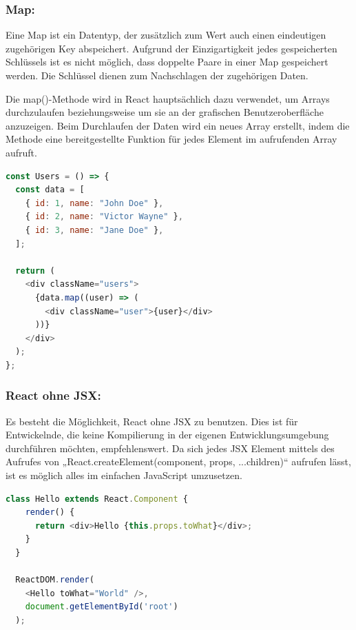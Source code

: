 \newpage

\subsubsection{Map:}
Eine Map ist ein Datentyp, der zusätzlich zum Wert auch einen eindeutigen zugehörigen Key abspeichert. Aufgrund der Einzigartigkeit jedes gespeicherten Schlüssels ist es nicht möglich, dass doppelte Paare in einer Map gespeichert werden. Die Schlüssel dienen zum Nachschlagen der zugehörigen Daten.

Die map()-Methode wird in React hauptsächlich dazu verwendet, um Arrays durchzulaufen beziehungsweise um sie an der grafischen Benutzeroberfläche anzuzeigen. Beim Durchlaufen der Daten wird ein neues Array erstellt, indem die Methode eine bereitgestellte Funktion für jedes Element im aufrufenden Array aufruft.
\cite{Map} \\

\begin{lstlisting}[language=JavaScript, caption=Beispiel Code für die Nutzung der map()-Methode, label=lst:impl:mapMethode]
  const Users = () => {
  const data = [
    { id: 1, name: "John Doe" },
    { id: 2, name: "Victor Wayne" },
    { id: 3, name: "Jane Doe" },
  ];

  return (
    <div className="users">
      {data.map((user) => (
        <div className="user">{user}</div>
      ))}
    </div>
  );
};
\end{lstlisting} \cite{Map}

\subsubsection{React ohne JSX:}
Es besteht die Möglichkeit, React ohne JSX zu benutzen. Dies ist für Entwickelnde, die keine Kompilierung in der eigenen Entwicklungsumgebung durchführen möchten, empfehlenswert.
Da sich jedes JSX Element mittels des Aufrufes von „React.createElement(component, props, ...children)“ aufrufen lässt, ist es möglich alles im einfachen JavaScript umzusetzen.
\cite{JSX} \\
\begin{lstlisting}[language=JavaScript, caption=Beispiel Code 'Hello World' mit JSX, label=lst:impl:helloWorldJSX]
  class Hello extends React.Component {
    render() {
      return <div>Hello {this.props.toWhat}</div>;
    }
  }

  ReactDOM.render(
    <Hello toWhat="World" />,
    document.getElementById('root')
  );
\end{lstlisting}
\cite{ReactWithoutJSX} \\

